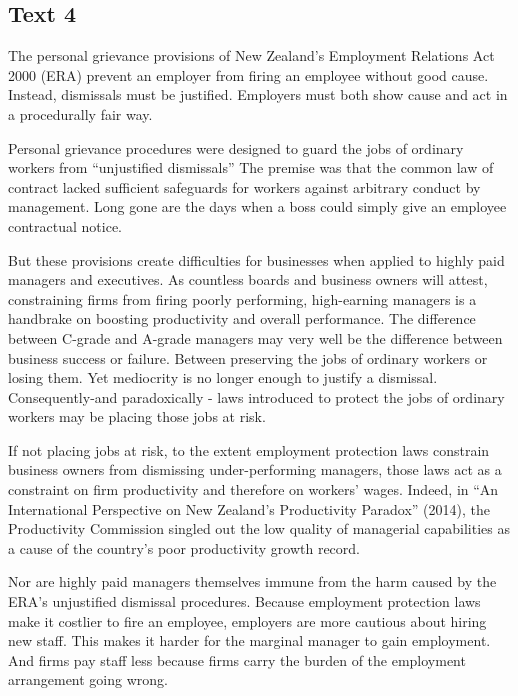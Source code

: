 \newpage
\subsection{Text 4}


The personal grievance provisions of New Zealand's Employment Relations
Act 2000 (ERA) prevent an
employer from firing an employee without good cause. Instead, dismissals
must be justified. Employers must both
show cause and act in a procedurally fair way.



Personal grievance procedures were designed to guard the jobs of
ordinary workers from ``unjustified
dismissals'' The premise was that the common law of contract lacked
sufficient safeguards for workers against
arbitrary conduct by management. Long gone are the days when a boss
could simply give an employee contractual
notice.




But these provisions create difficulties for businesses when applied to
highly paid managers and executives.
As countless boards and business owners will attest, constraining firms
from firing poorly performing,
high-earning managers is a handbrake on boosting productivity and
overall performance. The difference between
C-grade and A-grade managers may very well be the difference between
business success or failure. Between
preserving the jobs of ordinary workers or losing them. Yet mediocrity
is no longer enough to justify a dismissal.
Consequently-and paradoxically - laws introduced to protect the jobs of
ordinary workers may be placing those
jobs at risk.




If not placing jobs at risk, to the extent employment protection laws
constrain business owners from
dismissing under-performing managers, those laws act as a constraint on
firm productivity and therefore on
workers' wages. Indeed, in ``An International Perspective on New
Zealand's Productivity Paradox'' (2014), the
Productivity Commission singled out the low quality of managerial
capabilities as a cause of the country's poor
productivity growth record.




Nor are highly paid managers themselves immune from the harm caused by
the ERA's unjustified dismissal
procedures. Because employment protection laws make it costlier to fire
an employee, employers are more
cautious about hiring new staff. This makes it harder for the marginal
manager to gain employment. And firms pay
staff less because firms carry the burden of the employment arrangement
going wrong.




